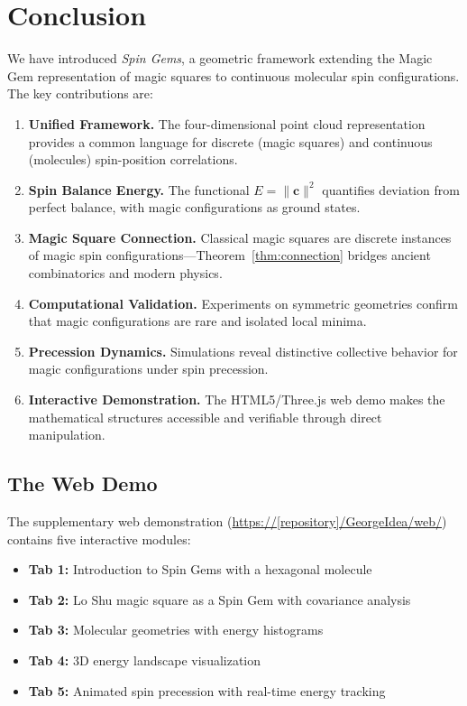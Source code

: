 \section{Conclusion}
\label{sec:conclusion}

We have introduced \emph{Spin Gems}, a geometric framework extending the Magic Gem representation of magic squares to continuous molecular spin configurations. The key contributions are:

\begin{enumerate}
    \item \textbf{Unified Framework.} The four-dimensional point cloud representation provides a common language for discrete (magic squares) and continuous (molecules) spin-position correlations.
    
    \item \textbf{Spin Balance Energy.} The functional $E = \|\mathbf{c}\|^2$ quantifies deviation from perfect balance, with magic configurations as ground states.
    
    \item \textbf{Magic Square Connection.} Classical magic squares are discrete instances of magic spin configurations---Theorem~\ref{thm:connection} bridges ancient combinatorics and modern physics.
    
    \item \textbf{Computational Validation.} Experiments on symmetric geometries confirm that magic configurations are rare and isolated local minima.
    
    \item \textbf{Precession Dynamics.} Simulations reveal distinctive collective behavior for magic configurations under spin precession.
    
    \item \textbf{Interactive Demonstration.} The HTML5/Three.js web demo makes the mathematical structures accessible and verifiable through direct manipulation.
\end{enumerate}

\subsection{The Web Demo}

The supplementary web demonstration (\url{https://[repository]/GeorgeIdea/web/}) contains five interactive modules:

\begin{itemize}
    \item \textbf{Tab 1:} Introduction to Spin Gems with a hexagonal molecule
    \item \textbf{Tab 2:} Lo Shu magic square as a Spin Gem with covariance analysis
    \item \textbf{Tab 3:} Molecular geometries with energy histograms
    \item \textbf{Tab 4:} 3D energy landscape visualization
    \item \textbf{Tab 5:} Animated spin precession with real-time energy tracking
\end{itemize}

